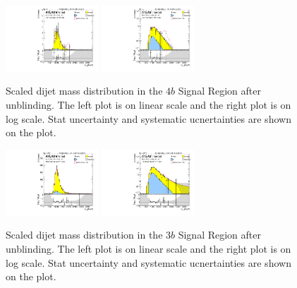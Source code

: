 \begin{figure}[htbp!]
\begin{center}
\includegraphics[width=0.31\textwidth,angle=-90]{figures/boosted/Signal_Syst/Moriond_bkg_9_FourTag_Signal_mHH_pole.pdf}
\includegraphics[width=0.31\textwidth,angle=-90]{figures/boosted/Signal_Syst/Moriond_bkg_9_FourTag_Signal_mHH_pole_1.pdf}
  \caption{Scaled dijet mass distribution in the $4b$ Signal Region after unblinding. The left plot is on linear scale and the right plot is on log scale. Stat uncertainty and systematic ucnertainties are shown on the plot.}
  \label{fig:boosted-4b-signal-pole}
\end{center}
\end{figure}

\begin{figure}[htbp!]
\begin{center}
\includegraphics[width=0.31\textwidth,angle=-90]{figures/boosted/Signal_Syst/Moriond_bkg_9_ThreeTag_Signal_mHH_pole.pdf}
\includegraphics[width=0.31\textwidth,angle=-90]{figures/boosted/Signal_Syst/Moriond_bkg_9_ThreeTag_Signal_mHH_pole_1.pdf}  
  \caption{Scaled dijet mass distribution in the $3b$ Signal Region after unblinding. The left plot is on linear scale and the right plot is on log scale. Stat uncertainty and systematic ucnertainties are shown on the plot.}
  \label{fig:boosted-3b-signal-pole}
\end{center}
\end{figure}


